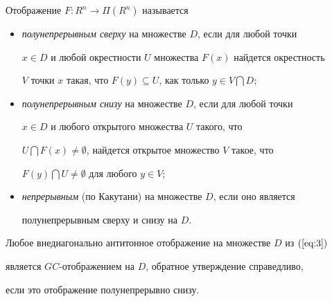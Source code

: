 \begin{defns}


\label{def:4}


Отображение $F: R^n \to \Pi (R^n)$ называется


\begin{itemize}


\item[а)] {\it полунепрерывным сверху} на множестве $D$, если для любой точки


$x \in D$ и любой окрестности $U$ множества $F(x)$ найдется окрестность


$V$ точки $x$ такая, что $F(y) \subseteq U$, как только $y \in V \bigcap D$;


\item[b)] {\it полунепрерывным снизу} на множестве $D$, если для любой точки


$x \in D$ и любого открытого множества  $U$ такого, что


$U \bigcap F(x) \neq \emptyset$, найдется открытое множество $V$ такое, что


$F(y) \bigcap U \neq \emptyset$ для любого $y \in V$;


\item[c)] {\it непрерывным} (по Какутани) на множестве $D$, если оно является 


полунепрерывным сверху и снизу на $D$.


\end{itemize}


\end{defns}








\begin{props}\label{pr:4}


Любое внедиагонально антитонное отображение на множестве $D$ из $(\ref{eq:3})$


является $GC$-отображением на $D$, обратное утверждение справедливо,


если это отображение полунепрерывно снизу.


\end{props}








